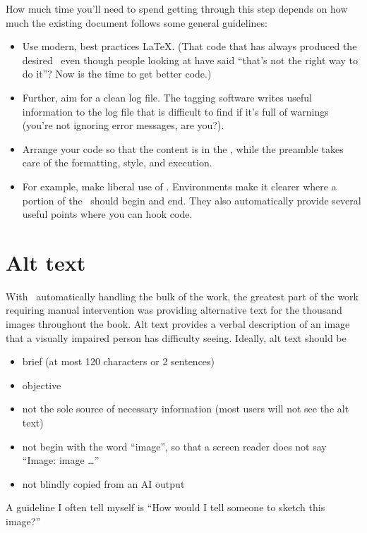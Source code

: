 \documentclass{ltugboat}
\begin{document}
How much time you'll need to spend getting through this step depends on
how much the existing document follows some general guidelines:
\begin{itemize}
\item Use modern, best practices \LaTeX.
(That code that has always produced the desired \PDF\ even though
people looking at have said ``that's not the right way to do it''?
Now is the time to get better code.)
\item Further, aim for a clean log file.
The tagging software writes useful information to the log file
that is difficult to find if it's full of warnings
(you're not ignoring error messages, are you?).
\item Arrange your code so that the content is in the ,
while the preamble takes care of the formatting, style, and execution.
\item For example, make liberal use of .
Environments make it clearer where a portion of the \PDF\ should begin and end.
They also automatically provide several useful points where you can hook code.
\end{itemize}

\section{Alt text}

With \LuaLaTeX\ automatically handling the bulk of the work,
the greatest part of the work requiring manual intervention was
providing alternative text for the thousand images throughout the book.
Alt text provides a verbal description of an image
that a visually impaired person has difficulty seeing.
Ideally, alt text should be
\begin{itemize}
\item brief (at most 120 characters or 2 sentences)
\item objective
\item not the sole source of necessary information
(most users will not see the alt text)
\item not begin with the word ``image'',
so that a screen reader does not say ``Image: image \dots''
\item not blindly copied from an AI output
\end{itemize}
A guideline I often tell myself is
``How would I tell someone to sketch this image?''
\end{document}
